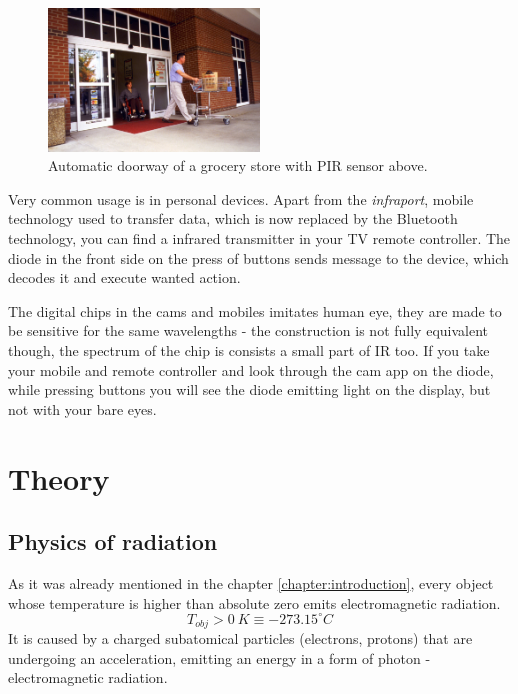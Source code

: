 \begin{figure}[h!]
  \begin{center}
    \includegraphics[width=0.5\textwidth]{obrazky-figures/automaticdoorway.jpg}
    \caption{Automatic doorway of a grocery store with PIR sensor above. \cite{automaticdoorway} \label{fig:automaticdoorway}}
  \end{center}
\end{figure}

Very common usage is in personal devices. Apart from the {\it infraport}, mobile technology used to
transfer data, which is now replaced by the Bluetooth technology, you can find a infrared
transmitter in your TV remote controller. The diode in the front side on the press of buttons sends
message to the device, which decodes it and execute wanted action.

The digital chips in the cams and mobiles imitates human eye, they are made to be sensitive for the
same wavelengths - the construction is not fully equivalent though, the spectrum of the chip is consists
a small part of IR too. If you take your mobile and remote controller and look through the cam app on
the diode, while pressing buttons you will see the diode emitting light on the display, but not with
your bare eyes.



\chapter{Theory}

\section{Physics of radiation}

As it was already mentioned in the chapter \ref{chapter:introduction}, every object whose temperature is higher
than absolute zero emits electromagnetic radiation. $$T_{obj}>0~K\equiv -273.15^{\circ}C$$
It is caused by a charged subatomical particles (electrons, protons) that are undergoing an acceleration, emitting an energy in a form
of photon - electromagnetic radiation.

